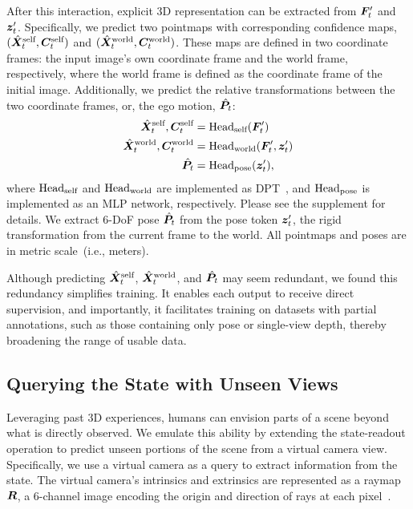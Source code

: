 After this interaction, explicit 3D representation can be extracted from  
$\bm{F}_t'$ and $\bm{z}_t'$. Specifically, we predict two pointmaps with corresponding confidence maps, $(\hat{\bm X}_t^\text{self}, \bm C_t^\text{self})$ and $(\hat{\bm X}_t^\text{world}, \bm C_t^\text{world})$. These maps are defined in two coordinate frames: the input image’s own coordinate frame and the world frame, respectively, where the world frame is defined as the coordinate frame of the initial image. Additionally, we
predict the relative transformations between the two coordinate frames, or, the ego motion, $\hat{\bm P}_t$: 
\begin{align}
    \hat{\bm X}_t^\text{self}, \bm C_t^\text{self} &= \mathrm{Head}_\text{self}(\bm{F}_t') \label{eq:head_self} \\
    \hat{\bm X}_t^\text{world}, \bm C_t^\text{world} &= \mathrm{Head}_\text{world}(\bm{F}_t', \bm{z}_t') \\
    \hat{\bm P}_t &= \mathrm{Head}_\text{pose}(\bm{z}_t'),
    \label{eq:head_pose}
\end{align}
where $\mathrm{Head}_\text{self}$ and $\mathrm{Head}_\text{world}$ are implemented as DPT~\cite{Ranftl2021}, and  $\mathrm{Head}_\text{pose}$ is implemented as an MLP network, respectively. Please see the supplement for details. We extract 6-DoF pose $\hat{\bm P}_t$ from the pose token $\bm{z}_t'$, the rigid transformation from the current frame to the world. All pointmaps and poses are in metric scale~(i.e., meters).

Although predicting $\hat{\bm X}_t^\text{self}$, $\hat{\bm X}_t^\text{world}$, and $\hat{\bm P}_t$ may seem redundant, 
we found this redundancy simplifies training.  It enables each output to receive direct supervision, and importantly,
it facilitates training on datasets with partial annotations, such as those containing only pose or single-view depth, thereby broadening the range of usable data.


\subsection{Querying the State with Unseen Views}



Leveraging past 3D experiences, humans can envision parts of a scene beyond what is directly observed. We emulate this ability by extending the state-readout operation to predict unseen portions of the scene from a virtual camera view.
Specifically, we use a virtual camera as a query to extract information from the state. The virtual camera's intrinsics and extrinsics are represented as a raymap 
$\bm R$, a 6-channel image encoding the origin and direction of rays at each pixel~\cite{zhang2024raydiffusion, gao2024cat3d, wu2024cat4d}.


